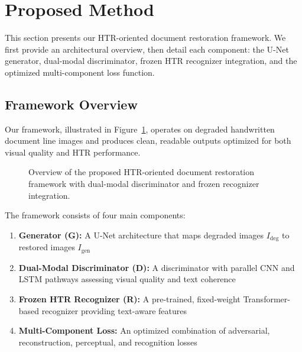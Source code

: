 \documentclass[journal]{IEEEtran}
\begin{document}
\section{Proposed Method}

This section presents our HTR-oriented document restoration framework. We first provide an architectural overview, then detail each component: the U-Net generator, dual-modal discriminator, frozen HTR recognizer integration, and the optimized multi-component loss function.

\subsection{Framework Overview}

Our framework, illustrated in Figure~\ref{fig:architecture_overview}, operates on degraded handwritten document line images and produces clean, readable outputs optimized for both visual quality and HTR performance.

\begin{figure}[!t]
\centering
\caption{Overview of the proposed HTR-oriented document restoration framework with dual-modal discriminator and frozen recognizer integration.}
\label{fig:architecture_overview}
\end{figure}

The framework consists of four main components:

\begin{enumerate}
    \item \textbf{Generator (G):} A U-Net architecture that maps degraded images $I_{\text{deg}}$ to restored images $I_{\text{gen}}$
    \item \textbf{Dual-Modal Discriminator (D):} A discriminator with parallel CNN and LSTM pathways assessing visual quality and text coherence
    \item \textbf{Frozen HTR Recognizer (R):} A pre-trained, fixed-weight Transformer-based recognizer providing text-aware features
    \item \textbf{Multi-Component Loss:} An optimized combination of adversarial, reconstruction, perceptual, and recognition losses
\end{enumerate}
\end{document}
